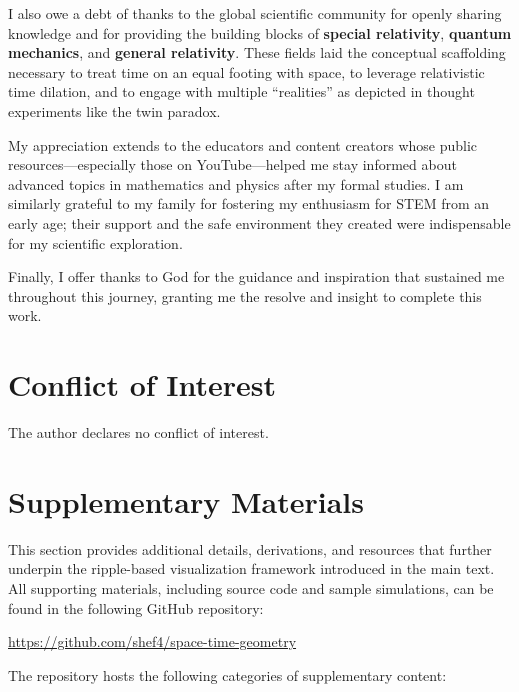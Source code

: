 \documentclass{article}
\begin{document}
I also owe a debt of thanks to the global scientific community for openly sharing knowledge and for providing the building blocks of \textbf{special relativity}, \textbf{quantum mechanics}, and \textbf{general relativity}. These fields laid the conceptual scaffolding necessary to treat time on an equal footing with space, to leverage relativistic time dilation, and to engage with multiple “realities” as depicted in thought experiments like the twin paradox.

My appreciation extends to the educators and content creators whose public resources—especially those on YouTube—helped me stay informed about advanced topics in mathematics and physics after my formal studies. I am similarly grateful to my family for fostering my enthusiasm for STEM from an early age; their support and the safe environment they created were indispensable for my scientific exploration.

Finally, I offer thanks to God for the guidance and inspiration that sustained me throughout this journey, granting me the resolve and insight to complete this work.

\section*{Conflict of Interest}
The author declares no conflict of interest.

\section*{Supplementary Materials}

This section provides additional details, derivations, and resources that further underpin the ripple-based visualization framework introduced in the main text. All supporting materials, including source code and sample simulations, can be found in the following GitHub repository:

\begin{center}
\url{https://github.com/shef4/space-time-geometry}
\end{center}

\noindent The repository hosts the following categories of supplementary content:
\end{document}
